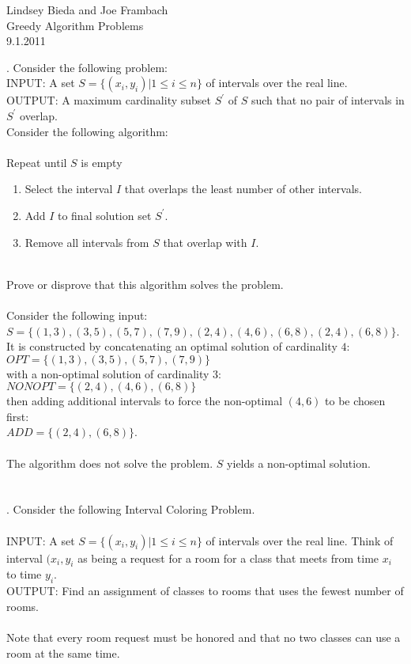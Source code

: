 \documentclass[10pt]{article}
\begin{document}
	\begin{flushright}
	Lindsey Bieda and Joe Frambach\\
	Greedy Algorithm Problems\\
	9.1.2011
	\end{flushright}
	. Consider the following problem:\\ 
	INPUT: A set $ S = \{(x_{i},y_{i})| 1\leq i \leq n\} $ of intervals over the real line.\\
	OUTPUT: A maximum cardinality subset $S^{\prime}$ of $S$ such that no pair of intervals in $S^{\prime}$ overlap. \\
	Consider the following algorithm:\\
	\\
	Repeat until $S$ is empty
	\begin{enumerate}
		\item Select the interval $I$ that overlaps the least number of other intervals.
		\item Add $I$ to final solution set $S^{\prime}$.
		\item Remove all intervals from $S$ that overlap with $I$.
	\end{enumerate}
	\\
    Prove or disprove that this algorithm solves the problem.\\
    \\
	Consider the following input:\\
    $ S = \{(1,3), (3,5), (5,7), (7,9), (2,4), (4,6), (6,8), (2,4), (6,8)\} $.\\
    It is constructed by concatenating an optimal solution of cardinality $4$:\\
    $ OPT = \{(1,3), (3,5), (5,7), (7,9)\} $\\
    with a non-optimal solution of cardinality $3$:\\
    $ NONOPT = \{(2,4), (4,6), (6,8)\} $\\
    then adding additional intervals to force the non-optimal $(4,6)$ to be chosen first:\\
    $ ADD = \{(2,4), (6,8)\}$.\\
    \\
    The algorithm does not solve the problem. $S$ yields a non-optimal solution.\\
	\\
	\\
	. Consider the following Interval Coloring Problem.\\
	\\
	INPUT: A set $ S = \{(x_{i},y_{i})| 1\leq i \leq n\} $ of intervals over the real line. 
	Think of interval $(x_{i},y_{i}$ as being a request for a room for a class that meets from 
	time $x_{i}$ to time $y_{i}$.\\
	OUTPUT: Find an assignment of classes to rooms that uses the fewest number of rooms.\\
	\\
	Note that every room request must be honored and that no two classes can use a room at the
	same time. 
\end{document}

